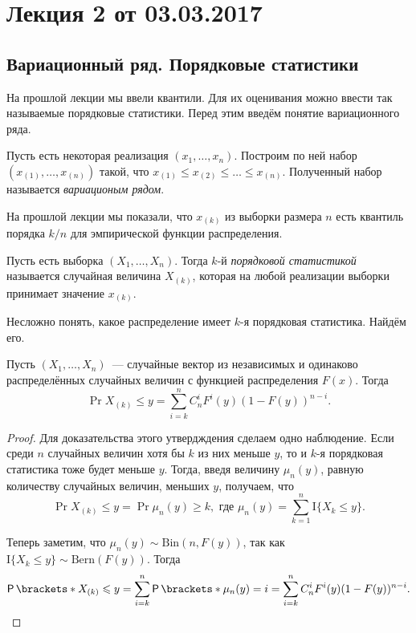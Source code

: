 \section{Лекция 2 от 03.03.2017}
\subsection{Вариационный ряд. Порядковые статистики}
На прошлой лекции мы ввели квантили. Для их оценивания можно ввести так 
называемые порядковые статистики. Перед этим введём понятие вариационного ряда.
\begin{definition}
	Пусть есть некоторая реализация \((x_{1}, \dots, x_{n})\). Построим по ней 
	набор \((x_{(1)}, \dots, x_{(n)})\) такой, что \(x_{(1)} \leq x_{(2)} \leq 
	\dots \leq x_{(n)}\). Полученный набор называется \emph{вариационым 
	рядом}.
\end{definition}
На прошлой лекции мы показали, что \(x_{(k)}\) из выборки размера \(n\) есть 
квантиль порядка \(k/n\) для эмпирической функции распределения.

\begin{definition}
	Пусть есть выборка \((X_{1}, \dots, X_{n})\). Тогда \(k\)-й 
	\emph{порядковой статистикой} называется случайная величина \(X_{(k)}\), 
	которая на любой реализации выборки принимает значение \(x_{(k)}\).
\end{definition}
Несложно понять, какое распределение имеет \(k\)-я порядковая статистика. 
Найдём его.
\begin{theorem}
	Пусть \((X_{1}, \dots, X_{n})\)~--- случайные вектор из независимых и 
	одинаково распределённых случайных величин с функцией распределения 
	\(F(x)\). Тогда
	\[
		\Pr{X_{(k)} \leq y} = \sum_{i = k}^{n} C_{n}^{i}F^{i}(y)(1 - 
		F(y))^{n - i}.
	\]
\end{theorem}
\begin{proof}
	Для доказательства этого утвердждения сделаем одно наблюдение. Если среди 
	\(n\) случайных величин хотя бы \(k\) из них меньше \(y\), то и \(k\)-я 
	порядковая статистика тоже будет меньше \(y\). Тогда, введя величину 
	\(\mu_{n}(y)\), равную количеству случайных величин, меньших \(y\), 
	получаем, что
	\[
		\Pr{X_{(k)} \leq y} = \Pr{\mu_{n}(y) \geq k}, \text{ где } \mu_{n}(y) = 
		\sum_{k = 1}^{n} \mathrm{I}\{X_{k} \leq y\}.
	\]
	
	Теперь заметим, что \(\mu_{n}(y) \sim \mathrm{Bin}(n, F(y))\), так как 
	\(\mathrm{I}\{X_{k} \leq y\} \sim \mathrm{Bern}(F(y))\). Тогда 
	\[
		\Pr{X_{(k)} \leq y} = \sum_{i = k}^{n} \Pr{\mu_{n}(y) = i} = \sum_{i = 
		k}^{n} C_{n}^{i}F^{i}(y)(1 - F(y))^{n - i}. \qedhere
	\]
\end{proof}

